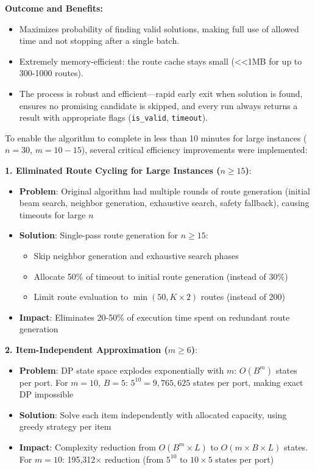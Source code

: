 \documentclass[12pt]{article}
\begin{document}
\textbf{Outcome and Benefits:}
\begin{itemize}
    \item Maximizes probability of finding valid solutions, making full use of allowed time and not stopping after a single batch.
    \item Extremely memory-efficient: the route cache stays small (<<1MB for up to 300-1000 routes).
    \item The process is robust and efficient—rapid early exit when solution is found, ensures no promising candidate is skipped, and every run always returns a result with appropriate flags (\texttt{is\_valid}, \texttt{timeout}).
\end{itemize}


To enable the algorithm to complete in less than 10 minutes for large instances ($n=30$, $m=10-15$), several critical efficiency improvements were implemented:

\textbf{1. Eliminated Route Cycling for Large Instances ($n \geq 15$)}:
\begin{itemize}
    \item \textbf{Problem}: Original algorithm had multiple rounds of route generation (initial beam search, neighbor generation, exhaustive search, safety fallback), causing timeouts for large $n$
    \item \textbf{Solution}: Single-pass route generation for $n \geq 15$:
    \begin{itemize}
        \item Skip neighbor generation and exhaustive search phases
        \item Allocate 50\% of timeout to initial route generation (instead of 30\%)
        \item Limit route evaluation to $\min(50, K \times 2)$ routes (instead of 200)
    \end{itemize}
    \item \textbf{Impact}: Eliminates 20-50\% of execution time spent on redundant route generation
\end{itemize}

\textbf{2. Item-Independent Approximation ($m \geq 6$)}:
\begin{itemize}
    \item \textbf{Problem}: DP state space explodes exponentially with $m$: $O(B^m)$ states per port. For $m=10$, $B=5$: $5^{10} = 9,765,625$ states per port, making exact DP impossible
    \item \textbf{Solution}: Solve each item independently with allocated capacity, using greedy strategy per item
    \item \textbf{Impact}: Complexity reduction from $O(B^m \times L)$ to $O(m \times B \times L)$ states. For $m=10$: 195,312$\times$ reduction (from $5^{10}$ to $10 \times 5$ states per port)
\end{itemize}
\end{document}
